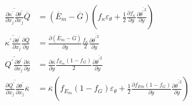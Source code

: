 \documentclass[10pt]{article}
\def\lp{\left(}
\def\rp{\right)}
\def\tp{\overline{{\theta^\prime}^2}}
\def\tr{{\theta^\prime}}
\def\et{{\varepsilon_{\theta}}}
\begin{document}
\begin{equation*} 
\begin{split}
\overline{\frac{\partial \kappa^\prime}{\partial x_j}\frac{\partial \tr}{\partial x_j}}\overline{Q} & = (\overline{E}_m-\overline{G}) \lp f_{\kappa} \et + \frac{1}{2}\frac{\partial f_{\kappa}}{\partial y}\frac{\partial \tp}{\partial y} \rp \\
\overline{\kappa^\prime\frac{\partial \tr}{\partial x_j}} \frac{\partial \overline{Q}}{\partial y} & = \frac{\partial (\overline{E}_m - \overline{G})}{\partial y} \frac{f_{\kappa}}{2} \frac{\partial \tp}{\partial y} \\
\overline{ Q^\prime\frac{\partial \tr}{\partial x_j}}\frac{\partial \overline{\kappa}}{\partial y} & = \frac{\partial \overline{\kappa}}{\partial y} \frac{f_{E_m}(1-f_G)}{2}\frac{\partial \tp}{\partial y}\\
\overline{\frac{\partial Q^\prime}{\partial x_j}\frac{\partial \tr}{\partial x_j}}\overline{\kappa} & = \overline{\kappa} \lp f_{E_m}(1-f_G) \et + \frac{1}{2}\frac{\partial f_{Em}(1-f_G)}{\partial y} \frac{\partial \tp}{\partial y} \rp
\end{split}
\end{equation*}
\end{document}
